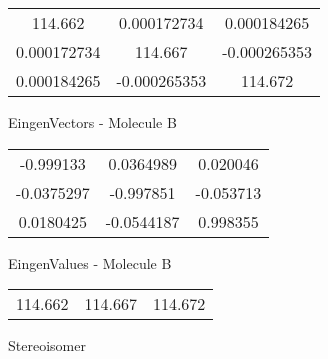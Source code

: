 \begin{multicols}{2}
\begin{center}
\begin{tabular}{|c c c|}
114.662	 & 	0.000172734	 & 	0.000184265	 \\
0.000172734	 & 	114.667	 & 	-0.000265353	 \\
0.000184265	 & 	-0.000265353	 & 	114.672
\end{tabular}

\vtab
 EingenVectors - Molecule B     \\
\vtab
\begin{tabular}{|c c c|}
-0.999133	 & 	0.0364989	 & 	0.020046	 \\
-0.0375297	 & 	-0.997851	 & 	-0.053713	 \\
0.0180425	 & 	-0.0544187	 & 	0.998355
\end{tabular}

\vtab
 EingenValues - Molecule B     \\
\vtab
\begin{tabular}{|c c c|}
114.662	 & 	114.667	 & 	114.672	 \\
\end{tabular}

\end{center}
\end{multicols}
\begin{center}
\vtab
\vtab
\textcolor{NavyBlue}{\Large Stereoisomer}
\end{center}

 \newpage

